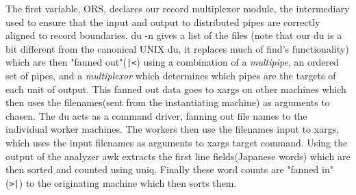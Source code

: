 \documentclass{sig-alt-release2}
\begin{document}
The first variable, ORS, declares our record multiplexor module, the intermediary 
used to ensure that the input and output to distributed pipes are correctly 
aligned to record boundaries. du -n gives a list of the files (note that our 
du is a bit different from the canonical UNIX du, it replaces much of find's 
functionality) which are then "fanned out"(\verb!|<!) using a combination 
of a \emph{multipipe}, an ordered set of pipes, and a \emph{multiplexor} 
which determines which pipes are the targets of each unit of output.  
This fanned out data goes to xargs on other machines which 
then uses the filenames(sent from the instantiating machine) as arguments to 
chasen. The du acts as a command driver, fanning out file names to the 
individual worker machines. The workers then use the filenames input to 
xargs, which uses the input filenames as arguments to xargs target command. 
Using the output of the analyzer awk extracts the first line fields(Japanese 
words) which are then sorted and counted using uniq.  Finally these word 
counts are "fanned in"(\verb!>|!) to the originating machine which then 
sorts them. 





\end{document}
